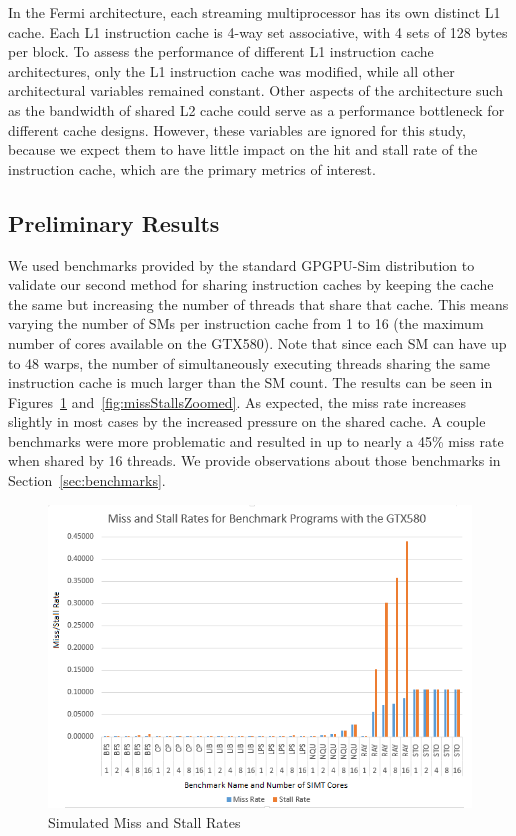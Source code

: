 In the Fermi architecture, each streaming multiprocessor has
its own distinct L1 cache. 
Each L1 instruction cache is 4-way set associative, with 4 sets of
128 bytes per block. 
To assess the  performance of different L1 instruction cache
architectures, only the L1 instruction cache was modified, while all
other architectural variables remained constant. 
Other aspects of the architecture such as the bandwidth of shared L2
cache could serve as a performance bottleneck for different cache
designs. 
However, these variables are ignored for this study, because we expect
them to have little impact on the hit and stall rate of the
instruction cache, which are the primary metrics of interest.

\subsection{Preliminary Results}

We used benchmarks provided by the standard GPGPU-Sim distribution
to validate our second method for sharing instruction caches by
keeping the cache the same but increasing the number of threads that
share that cache.
This means varying the number of SMs per instruction cache from 1 to
16 (the maximum number of cores available on the GTX580).
Note that since each SM can have up to 48 warps, the number of
simultaneously executing threads sharing the same instruction cache is
much larger than the SM count.
The results can be seen in Figures~\ref{fig:missStalls}
and~\ref{fig:missStallsZoomed}. 
As expected, the miss rate increases slightly in most cases by the
increased pressure on the shared cache.
A couple benchmarks were more problematic and resulted in up to nearly
a 45\% miss rate when shared by 16 threads.
We provide observations about those benchmarks in
Section~\ref{sec:benchmarks}.

\begin{figure}
\centering
\includegraphics[width=\columnwidth]{graphics/miss_stalls_benchmarks.png}
\caption{Simulated Miss and Stall Rates
}
\label{fig:missStalls}
\end{figure}

